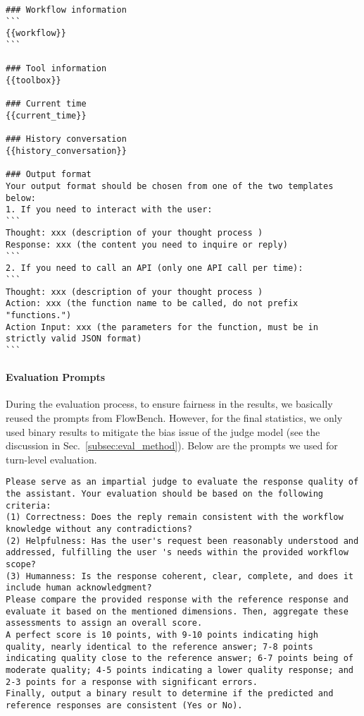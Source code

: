 \begin{envnew}
\begin{lstlisting}[language={}, caption=Prompt for ReAct]
### Workflow information
```
{{workflow}}
```

### Tool information
{{toolbox}}

### Current time
{{current_time}}

### History conversation
{{history_conversation}}

### Output format
Your output format should be chosen from one of the two templates below:
1. If you need to interact with the user:
```
Thought: xxx (description of your thought process ) 
Response: xxx (the content you need to inquire or reply)
```
2. If you need to call an API (only one API call per time): 
```
Thought: xxx (description of your thought process ) 
Action: xxx (the function name to be called, do not prefix "functions.")
Action Input: xxx (the parameters for the function, must be in strictly valid JSON format)
```
\end{lstlisting}


\paragraph{Evaluation Prompts}
During the evaluation process, to ensure fairness in the results, we basically reused the prompts from FlowBench. However, for the final statistics, we only used binary results to mitigate the bias issue of the judge model (see the discussion in Sec.~\ref{subsec:eval_method}). 
Below are the prompts we used for turn-level evaluation.
\begin{lstlisting}[language={}, caption=Prompt for turn-level evaluation]
Please serve as an impartial judge to evaluate the response quality of the assistant. Your evaluation should be based on the following criteria:
(1) Correctness: Does the reply remain consistent with the workflow knowledge without any contradictions?
(2) Helpfulness: Has the user's request been reasonably understood and addressed, fulfilling the user 's needs within the provided workflow scope?
(3) Humanness: Is the response coherent, clear, complete, and does it include human acknowledgment?
Please compare the provided response with the reference response and evaluate it based on the mentioned dimensions. Then, aggregate these assessments to assign an overall score. 
A perfect score is 10 points, with 9-10 points indicating high quality, nearly identical to the reference answer; 7-8 points indicating quality close to the reference answer; 6-7 points being of moderate quality; 4-5 points indicating a lower quality response; and 2-3 points for a response with significant errors.
Finally, output a binary result to determine if the predicted and reference responses are consistent (Yes or No).


\end{lstlisting}
\end{envnew}
